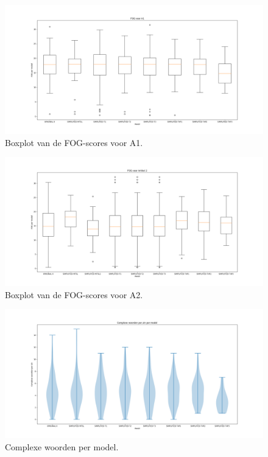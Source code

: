 \begin{figure}
	\includegraphics[width=\linewidth]{img/boxplot-fog-a1.png}
	\caption{Boxplot van de FOG-scores voor A1.}
	\label{img:boxplot-fog-a1}
\end{figure}

\begin{figure}
	\includegraphics[width=\linewidth]{img/boxplot-fog-a2.png}
	\caption{Boxplot van de FOG-scores voor A2.}
	\label{img:boxplot-fog-a2}
\end{figure}

\begin{figure}
	\includegraphics[width=\linewidth]{img/violinplot-complex-a1.png}
	\caption{Complexe woorden per model.}
	\label{img:violinplot-complex-a1}
\end{figure}

